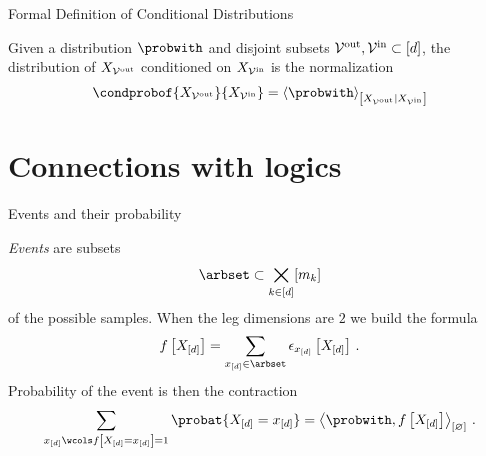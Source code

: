 \documentclass{beamer}
\begin{document}
    \begin{frame}{Formal Definition of Conditional Distributions}

        \begin{definition}
	Given a distribution $\probwith$ and disjoint subsets $\mathcal{V}^{\mathrm{out}},\mathcal{V}^{\mathrm{in}}\subset[d]$, the distribution of $X_{\mathcal{V}^{\mathrm{out}}}$ conditioned on $X_{\mathcal{V}^{\mathrm{in}}}$ is the normalization
    \begin{align*}
        \condprobof{\catvariableof{\outnodes}}{\catvariableof{\innodes}}
        = \normalizationofwrt{\probwith}{\catvariableof{\outnodes}}{\catvariableof{\innodes}}
    \end{align*}
        \end{definition}

        \begin{center}
            
        \end{center}

    \end{frame}



    \section{Connections with logics}


    \begin{frame}{Events and their probability}
        \par
        \emph{Events} are subsets
        \begin{align*}
            \arbset \subset \bigtimes_{\catenumeratorin} [\catdimof{\catenumerator}]
        \end{align*}
        of the possible samples.
        When the leg dimensions are $2$ we build the formula
        \begin{align*}
            \formulawith
            = \sum_{\shortcatindices\in\arbset} \onehotmapofat{\shortcatindices}{\shortcatvariables} \, .
        \end{align*}
        Probability of the event is then the contraction
        \begin{align*}
            \sum_{\shortcatindices\wcols\formulaat{\indexedshortcatvariables}=1} \probat{\indexedshortcatvariables}
            = \contraction{\probwith,\formulawith} \, .
        \end{align*}
    \end{frame}
\end{document}
